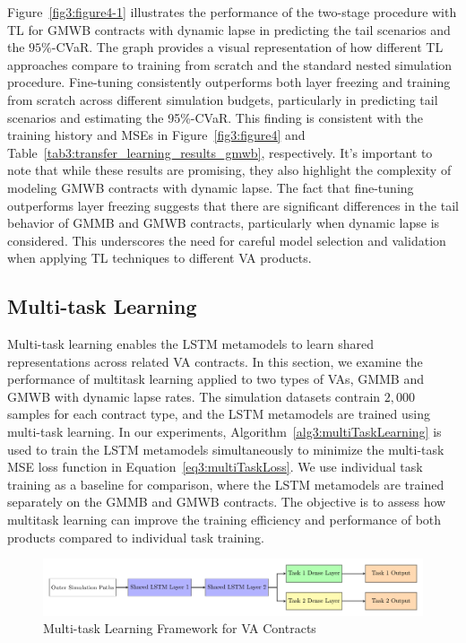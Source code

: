 Figure~\ref{fig3:figure4-1} illustrates the performance of the two-stage procedure with TL for GMWB contracts with dynamic lapse in predicting the tail scenarios and the $95\%$-CVaR.
The graph provides a visual representation of how different TL approaches compare to training from scratch and the standard nested simulation procedure.
Fine-tuning consistently outperforms both layer freezing and training from scratch across different simulation budgets, particularly in predicting tail scenarios and estimating the 95\%-CVaR. 
This finding is consistent with the training history and MSEs in Figure~\ref{fig3:figure4} and Table~\ref{tab3:transfer_learning_results_gmwb}, respectively.
It's important to note that while these results are promising, they also highlight the complexity of modeling GMWB contracts with dynamic lapse. 
The fact that fine-tuning outperforms layer freezing suggests that there are significant differences in the tail behavior of GMMB and GMWB contracts, particularly when dynamic lapse is considered. 
This underscores the need for careful model selection and validation when applying TL techniques to different VA products.

\subsection{Multi-task Learning}

Multi-task learning enables the LSTM metamodels to learn shared representations across related VA contracts.
In this section, we examine the performance of multitask learning applied to two types of VAs, GMMB and GMWB with dynamic lapse rates.
The simulation datasets contrain $2,\!000$ samples for each contract type, and the LSTM metamodels are trained using multi-task learning. 
In our experiments, Algorithm~\ref{alg3:multiTaskLearning} is used to train the LSTM metamodels simultaneously to minimize the multi-task MSE loss function in Equation~\ref{eq3:multiTaskLoss}.
We use individual task training as a baseline for comparison, where the LSTM metamodels are trained separately on the GMMB and GMWB contracts.
The objective is to assess how multitask learning can improve the training efficiency and performance of both products compared to individual task training.

\begin{figure}[ht!]
    \includegraphics[width=\textwidth]{./project3/tikz/mtl.pdf}
    \caption{Multi-task Learning Framework for VA Contracts}
    \label{fig3:mtl}
\end{figure}

